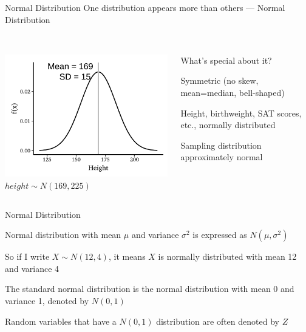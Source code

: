\documentclass{./../div_teaching_slides}
\begin{document}
\begin{frame}{Normal Distribution}
One distribution appears more than others --- Normal Distribution \\~\\
\begin{columns}[c]
\begin{column}{0.5\textwidth}
\centering
\includegraphics[scale=0.85]{./../../Output/height_norm_pdf.pdf} \\
$ height \sim N(169, 225) $
\end{column}
\begin{column}{0.6\textwidth}
\vspace{-1.5cm}

What's special about it? \\
\begin{witemize}
\item Symmetric (no skew, mean=median, bell-shaped)
\item Height, birthweight, SAT scores, etc., normally distributed 
\item Sampling distribution approximately normal
\end{witemize}
\end{column}
\end{columns}
\end{frame}

\begin{frame}{Normal Distribution}
\begin{witemize}
  \item Normal distribution with mean $\mu$ and variance $\sigma^2$ is expressed as $N(\mu,\sigma^2) $
  \item So if I write $X \sim N(12,4) $, it means $X$ is normally distributed with mean 12 and variance 4
  \item The standard normal distribution is the normal distribution with mean 0 and variance 1, denoted by $N(0,1)$
  \item Random variables that have a $N(0,1)$ distribution are often denoted by $Z$
\end{witemize}
\end{frame}
\end{document}
